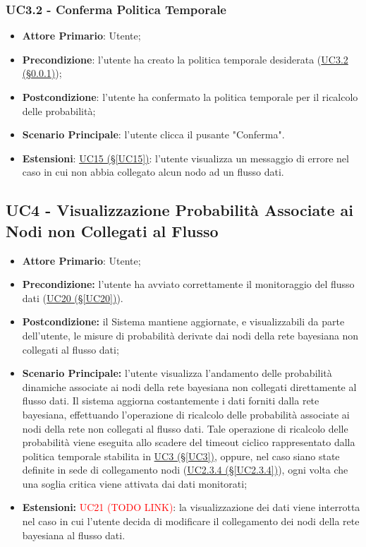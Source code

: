 \subsubsection{UC3.2 - Conferma Politica Temporale}\label{UC3.2}
\begin{itemize}
	\item \textbf{Attore Primario}: Utente; 
	\item \textbf{Precondizione}: l'utente ha creato la politica temporale desiderata (\hyperref[UC3.2]{UC3.2 (§\ref*{UC3.2})});
	\item \textbf{Postcondizione}: l'utente ha confermato la politica temporale per il ricalcolo delle probabilità; 
	\item \textbf{Scenario Principale}: l'utente clicca il pusante "Conferma".
	\item \textbf{Estensioni}: \hyperref[UC15]{UC15 (§\ref*{UC15})}: l'utente visualizza un messaggio di errore nel caso in cui non abbia collegato alcun nodo ad un flusso dati.
\end{itemize}

\newpage

\subsection{UC4 - Visualizzazione Probabilità Associate ai Nodi non Collegati al Flusso}\label{UC4}

\begin{itemize}
\item \textbf{Attore Primario}: Utente;
\item \textbf{Precondizione:} l'utente ha avviato correttamente il monitoraggio del flusso dati (\hyperref[UC20]{UC20 (§\ref*{UC20})}).
\item \textbf{Postcondizione:} il Sistema mantiene aggiornate, e visualizzabili da parte dell'utente, le misure di probabilità derivate dai nodi della rete bayesiana non collegati al flusso dati;
\item \textbf{Scenario Principale:} l'utente visualizza l'andamento delle probabilità dinamiche associate ai nodi 			della rete bayesiana non collegati direttamente al flusso dati. Il sistema aggiorna costantemente i dati forniti dalla rete bayesiana, effettuando l'operazione di ricalcolo delle probabilità associate ai nodi della rete non collegati al flusso dati. Tale operazione di ricalcolo delle probabilità viene eseguita allo scadere del timeout ciclico rappresentato dalla politica temporale stabilita in \hyperref[UC3]{UC3 (§\ref*{UC3})}, oppure, nel caso siano state definite in sede di collegamento nodi (\hyperref[UC2.3.4]{UC2.3.4 (§\ref*{UC2.3.4})}), ogni volta che una soglia critica viene attivata dai dati monitorati;
\item \textbf{Estensioni:} \textcolor{red}{UC21 (TODO LINK)}: la visualizzazione dei dati viene interrotta nel 			caso in cui l'utente decida di modificare il collegamento dei nodi della rete bayesiana al flusso dati.
\end{itemize}

